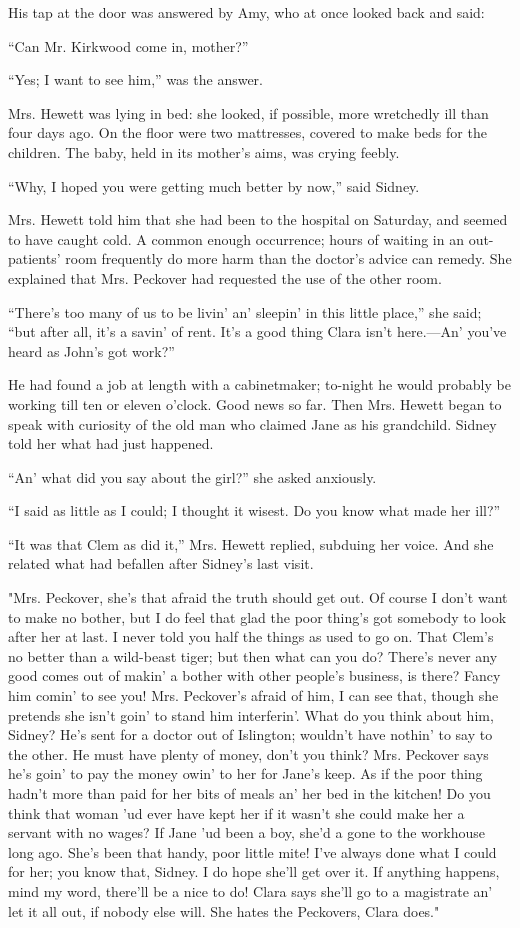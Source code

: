 His tap at the door was answered by Amy, who at once looked back and
said:

``Can Mr. Kirkwood come in, mother?''

``Yes; I want to see him,'' was the answer.

Mrs. Hewett was lying in bed: she looked, if possible, more wretchedly
ill than four days ago. On the floor were two mattresses, covered to
make beds for the children. The baby, held in its mother's aims, was
crying feebly.

``Why, I hoped you were getting much better by now,'' said Sidney.

Mrs. Hewett told him that she had been to the hospital on Saturday, and
seemed to have caught cold. A common enough occurrence; hours of waiting
in an out-patients' {}room frequently do more harm than the doctor's
advice can remedy. She explained that Mrs. Peckover had requested the
use of the other room.

``There's too many of us to be livin' an' sleepin' in this little
place,'' she said; ``but after all, it's a savin' of rent. It's a good
thing Clara isn't here.---An' you've heard as John's got work?''

He had found a job at length with a cabinetmaker; to-night he would
probably be working till ten or eleven o'clock. Good news so far. Then
Mrs. Hewett began to speak with curiosity of the old man who claimed
Jane as his grandchild. Sidney told her what had just happened.

``An' what did you say about the girl?'' she asked anxiously.

``I said as little as I could; I thought it wisest. Do you know what
made her ill?''

``It was that Clem as did it,'' Mrs. Hewett replied, subduing her voice.
And she related what had befallen after Sidney's last visit.

"Mrs. Peckover, she's that afraid the truth {}should get out. Of course
I don't want to make no bother, but I do feel that glad the poor thing's
got somebody to look after her at last. I never told you half the things
as used to go on. That Clem's no better than a wild-beast tiger; but
then what can you do? There's never any good comes out of makin' a
bother with other people's business, is there? Fancy him comin' to see
you! Mrs. Peckover's afraid of him, I can see that, though she pretends
she isn't goin' to stand him interferin'. What do you think about him,
Sidney? He's sent for a doctor out of Islington; wouldn't have nothin'
to say to the other. He must have plenty of money, don't you think? Mrs.
Peckover says he's goin' to pay the money owin' to her for Jane's keep.
As if the poor thing hadn't more than paid for her bits of meals an' her
bed in the kitchen! Do you think that woman 'ud ever have kept her if it
wasn't she could make her a servant with no wages? If Jane 'ud been a
boy, she'd a gone to the workhouse long ago. She's been that handy,
{}poor little mite! I've always done what I could for her; you know
that, Sidney. I do hope she'll get over it. If anything happens, mind my
word, there'll be a nice to do! Clara says she'll go to a magistrate an'
let it all out, if nobody else will. She hates the Peckovers, Clara
does."

